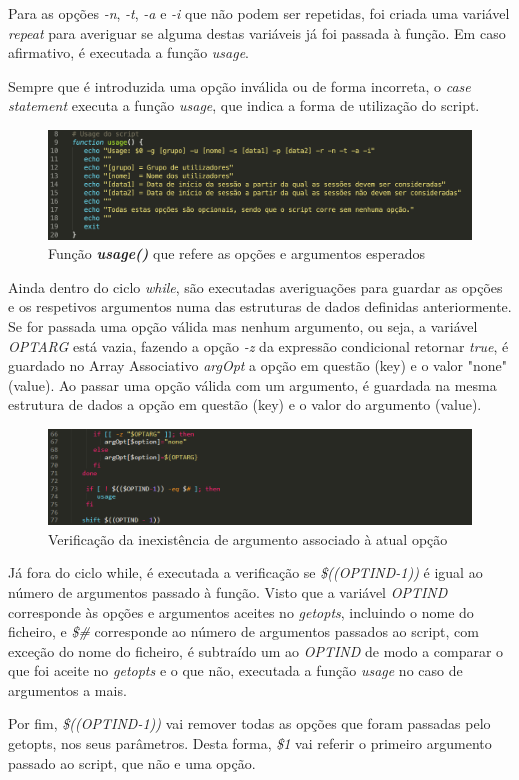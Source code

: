 \documentclass[10pt,portuguese]{article}
\begin{document}
\par Para as opções \textit{-n}, \textit{-t}, \textit{-a} e \textit{-i} que não podem ser repetidas, foi criada uma variável \textit{repeat} para averiguar se alguma destas variáveis já foi passada à função. Em caso afirmativo, é executada a função \textit{usage}.
\par Sempre que é introduzida uma opção inválida ou de forma incorreta, o \textit{case statement} executa a função \textit{usage}, que indica a forma de utilização do script.
\begin{figure}[!h]
    \centering
    \includegraphics[width=\textwidth]{usage.png}
    \caption{Função \textbf{\textit{usage()}} que refere as opções e argumentos esperados}
\end{figure}
\newline
\par Ainda dentro do ciclo \textit{while}, são executadas averiguações para guardar as opções e os respetivos argumentos numa das estruturas de dados definidas anteriormente. Se for passada uma opção válida mas nenhum argumento, ou seja, a variável \textit{OPTARG} está vazia, fazendo a opção \textit{-z} da expressão condicional retornar \textit{true}, é guardado no Array Associativo \textit{argOpt} a opção em questão (key) e o valor "none" (value). Ao passar uma opção válida com um argumento, é guardada na mesma estrutura de dados a opção em questão (key) e o valor do argumento (value).
\begin{figure}[!h]
    \centering
    \includegraphics[width=\textwidth]{optarg.png}
    \caption{Verificação da inexistência de argumento associado à atual opção}
\end{figure}
\par Já fora do ciclo while, é executada a verificação se \textit{\$((OPTIND-1))} é igual ao número de argumentos passado à função. Visto que a variável \textit{OPTIND} corresponde às opções e argumentos aceites no \textit{getopts}, incluindo o nome do ficheiro, e \textit{\$\#} corresponde ao número de argumentos passados ao script, com exceção do nome do ficheiro, é subtraído um ao \textit{OPTIND} de modo a comparar o que foi aceite no \textit{getopts} e o que não, executada a função \textit{usage} no caso de argumentos a mais.
\par Por fim, \textit{\$((OPTIND-1))} vai remover todas as opções que foram passadas pelo getopts, nos seus parâmetros. Desta forma, \textit{\$1} vai referir o primeiro argumento passado ao script, que não e uma opção.
\end{document}
